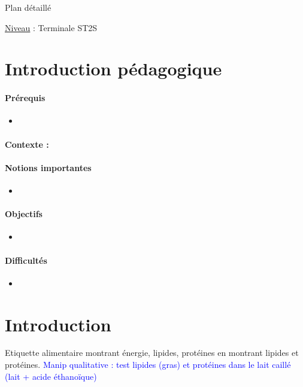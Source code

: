 \begin{reportBlock}{Plan détaillé}

\underline{Niveau} : Terminale ST2S \\

\section*{Introduction pédagogique}


\paragraph*{Prérequis}
\begin{itemize}
\item
\end{itemize}
\paragraph*{Contexte :}


\paragraph*{Notions importantes}

\begin{itemize}
\item 
\end{itemize}

\paragraph*{Objectifs}

\begin{itemize}
\item 
\end{itemize}

\paragraph*{Difficultés}

\begin{itemize}
\item 
\end{itemize}


\section*{Introduction }
Etiquette alimentaire montrant énergie, lipides, protéines en montrant lipides et protéines.
\textcolor{blue}{Manip qualitative : test lipides (gras) et protéines dans le lait caillé (lait + acide éthanoïque)}


\end{reportBlock}
